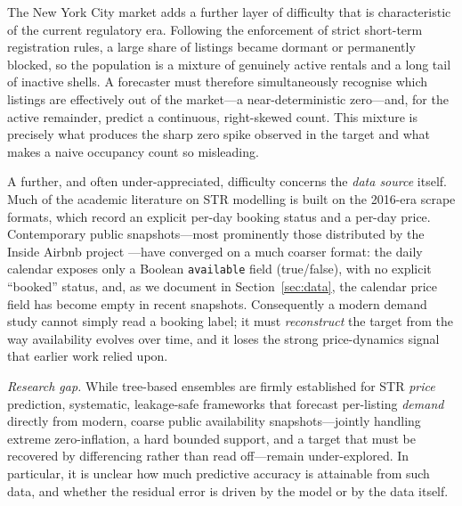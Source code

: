 \documentclass[journal]{IEEEtran}
\begin{document}
The New York City market adds a further layer of difficulty that is characteristic
of the current regulatory era. Following the enforcement of strict short-term
registration rules, a large share of listings became dormant or permanently
blocked, so the population is a mixture of genuinely active rentals and a long tail
of inactive shells. A forecaster must therefore simultaneously recognise which
listings are effectively out of the market---a near-deterministic zero---and, for
the active remainder, predict a continuous, right-skewed count. This mixture is
precisely what produces the sharp zero spike observed in the target and what makes
a naive occupancy count so misleading.

A further, and often under-appreciated, difficulty concerns the \emph{data source}
itself. Much of the academic literature on STR modelling is built on the 2016-era
scrape formats, which record an explicit per-day booking status and a per-day
price. Contemporary public snapshots---most prominently those distributed by the
Inside Airbnb project \cite{insideairbnb}---have converged on a much coarser
format: the daily calendar exposes only a Boolean \texttt{available} field
(true/false), with no explicit ``booked'' status, and, as we document in
Section~\ref{sec:data}, the calendar price field has become empty in recent
snapshots. Consequently a modern demand study cannot simply read a booking label;
it must \emph{reconstruct} the target from the way availability evolves over time,
and it loses the strong price-dynamics signal that earlier work relied upon.

\emph{Research gap.} While tree-based ensembles are firmly established for
STR \emph{price} prediction, systematic, leakage-safe frameworks that forecast
per-listing \emph{demand} directly from modern, coarse public availability
snapshots---jointly handling extreme zero-inflation, a hard bounded support, and a
target that must be recovered by differencing rather than read off---remain
under-explored. In particular, it is unclear how much predictive accuracy is
attainable from such data, and whether the residual error is driven by the model
or by the data itself.
\end{document}

